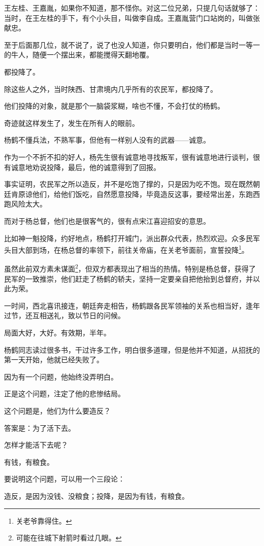 \begin{multicols}{\theparacolNo}
		王左桂、王嘉胤，如果你不知道，那不怪你。对这二位兄弟，只提几句话就够了：当时，在王左桂的手下，有个小头目，叫做李自成。王嘉胤营门口站岗的，叫做张献忠。

		至于后面那几位，就不说了，说了也没人知道，你只要明白，他们都是当时一等一的牛人，随便一个摆出来，都能搅得天翻地覆。

		都投降了。

		除这些人之外，当时陕西、甘肃境内几乎所有的农民军，都投降了。

		他们投降的对象，就是那个一脑袋浆糊，啥也不懂，不会打仗的杨鹤。

		奇迹就这样发生了，发生在所有人的眼前。

		杨鹤不懂兵法，不熟军事，但他有一样别人没有的武器——诚意。

		作为一个不折不扣的好人，杨先生很有诚意地寻找叛军，很有诚意地进行谈判，很有诚意地劝说投降，最后，他的诚意得到了回报。

		事实证明，农民军之所以造反，并不是吃饱了撑的，只是因为吃不饱。现在既然朝廷肯原谅他们，给他们饭吃，自然愿意投降，毕竟造反这事，要经常出差，东跑西跑风险太大。

		而对于杨总督，他们也是很客气的，很有点宋江喜迎招安的意思。

		比如神一魁投降，约好地点，杨鹤打开城门，派出群众代表，热烈欢迎。众多民军头目大部到场，在杨总督的率领下，前往关帝庙，在关老爷面前，宣誓投降\footnote{关老爷靠得住。}。

		虽然此前双方素未谋面\footnote{可能在往城下射箭时看过几眼。}，但双方都表现出了相当的热情。特别是杨总督，获得了民军的一致推崇，他们赶走了杨鹤的轿夫，坚持一定要亲自把他抬到总督府，并以此为荣。

		一时间，西北喜讯接连，朝廷奔走相告，杨鹤跟各民军领袖的关系也相当好，逢年过节，还互相送礼，致以节日的问候。

		局面大好，大好。有效期，半年。

		杨鹤同志读过很多书，干过许多工作，明白很多道理，但是他并不知道，从招抚的第一天开始，他就已经失败了。

		因为有一个问题，他始终没弄明白。

		正是这个问题，注定了他的悲惨结局。

		这个问题是，他们为什么要造反？

		答案是：为了活下去。

		怎样才能活下去呢？

		有钱，有粮食。

		要说明这个问题，可以用一个三段论：

		造反，是因为没钱、没粮食；投降，是因为有钱，有粮食。


\end{multicols}
